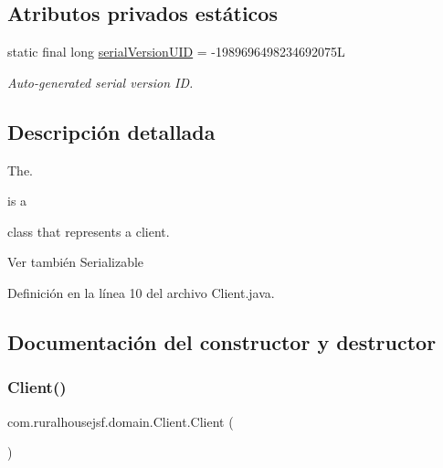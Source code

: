 \subsection*{Atributos privados estáticos}
\begin{DoxyCompactItemize}
\item 
static final long \mbox{\hyperlink{classcom_1_1ruralhousejsf_1_1domain_1_1_client_a6ac812041b6242509f710f231010ad7f}{serial\+Version\+U\+ID}} = -\/1989696498234692075L
\begin{DoxyCompactList}\small\item\em Auto-\/generated serial version ID. \end{DoxyCompactList}\end{DoxyCompactItemize}


\subsection{Descripción detallada}
The. 


\begin{DoxyCode}{0}
\end{DoxyCode}
 is a
\begin{DoxyCode}{0}
\end{DoxyCode}
 class that represents a client.

\begin{DoxySeeAlso}{Ver también}
Serializable 
\end{DoxySeeAlso}


Definición en la línea 10 del archivo Client.\+java.



\subsection{Documentación del constructor y destructor}
\mbox{\label{classcom_1_1ruralhousejsf_1_1domain_1_1_client_a351f5095f2aa19b4b43bd39c069d7e43}} 
\subsubsection{\texorpdfstring{Client()}{Client()}\hspace{0.1cm}{\footnotesize\ttfamily [1/2]}}
{\footnotesize\ttfamily com.\+ruralhousejsf.\+domain.\+Client.\+Client (\begin{DoxyParamCaption}{ }\end{DoxyParamCaption})\hspace{0.3cm}{\ttfamily [package]}}



